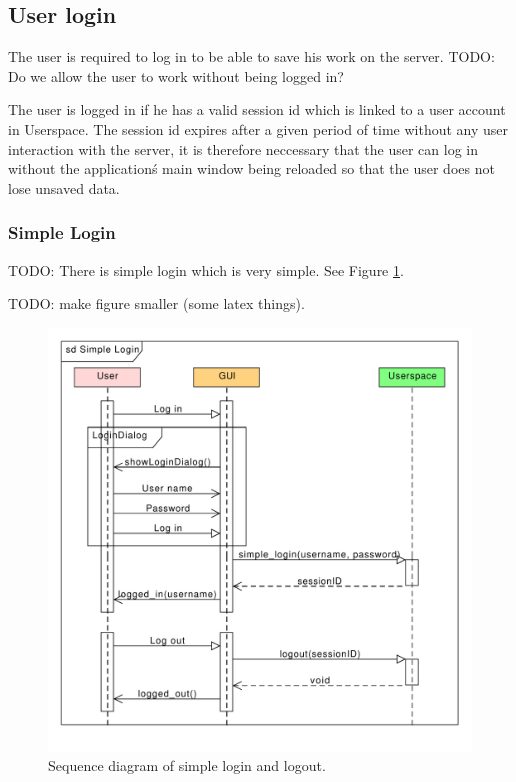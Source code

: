 \subsection{User login}

The user is required to log in to be able to save his work on the server.
TODO: Do we allow the user to work without being logged in?

The user is logged in if he has a valid session id which is linked to a user account in Userspace.
The session id expires after a given period of time without any user interaction with the server,
it is therefore neccessary that the user can log in without the application\'s main window being reloaded so that the user does not lose unsaved data.

\subsubsection{Simple Login}

TODO: There is simple login which is very simple. See Figure \ref{gui:sd:simple_login}.

TODO: make figure smaller (some latex things).

\begin{figure}[h]
\begin{center}
\includegraphics{figures/simple_login_sequence.pdf}
\end{center}
\caption{Sequence diagram of simple login and logout.}\label{gui:sd:simple_login}
\end{figure}

